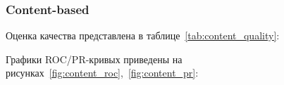 \pagebreak

\subsubsection{Content-based}
Оценка качества представлена в таблице~\ref{tab:content_quality}:

\begin{table}[h]
    \caption{Значения метрик}
    \label{tab:content_quality}
\end{table}

Графики ROC/PR-кривых приведены на рисунках~\ref{fig:content_roc},~\ref{fig:content_pr}:

